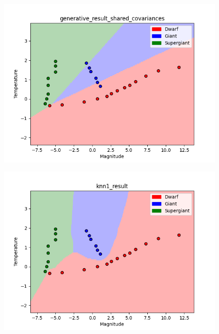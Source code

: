 \documentclass[submit]{harvardml}
\begin{document}
\begin{enumerate}
\newpage
\begin{figure}[h]
\includegraphics[scale=0.8]{generative_result_shared_covariances.png}
\centering
\end{figure}

\newpage
\begin{figure}[h]
\includegraphics[scale=0.8]{knn1_result.png}
\centering
\end{figure}


\end{enumerate}
\end{document}

